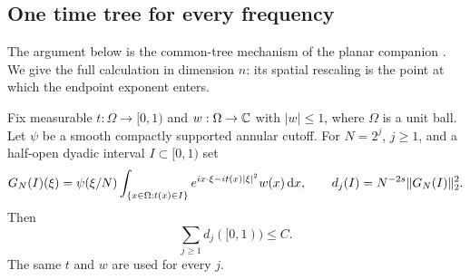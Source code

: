 \subsection{One time tree for every frequency}

The argument below is the common-tree mechanism of the planar
companion \citep[Section~9]{PSE2026}.  We give the full
calculation in dimension $n$: its spatial rescaling is the point at
which the endpoint exponent enters.

\begin{lemma}
\label{e:dual-square}
Fix measurable $t:\Omega\to[0,1)$ and $w:\Omega\to\mathbb C$ with $|w|\le1$,
where $\Omega$ is a unit ball.  Let $\psi$ be a smooth compactly
supported annular cutoff.  For $N=2^j$, $j\ge1$, and a half-open dyadic
interval $I\subset[0,1)$ set
\[
 G_N(I)(\xi)=\psi(\xi/N)
    \int_{\{x\in\Omega:t(x)\in I\}}
         e^{ix\cdot\xi-it(x)|\xi|^2}w(x)\,\mathrm d x,
 \qquad d_j(I)=N^{-2s}\lVert G_N(I)\rVert_2^2.
\]
Then
\begin{equation}
 \sum_{j\ge1}d_j([0,1))\le C.
 \label{e:dual-square-formula}
\end{equation}
The same $t$ and $w$ are used for every $j$.
\end{lemma}

